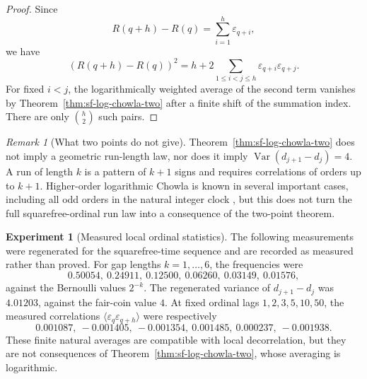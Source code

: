 \documentclass[11pt]{amsart}
\numberwithin{equation}{section}
\theoremstyle{plain}
\theoremstyle{definition}
\newtheorem{experiment}[theorem]{Experiment}
\theoremstyle{remark}
\newtheorem{remark}[theorem]{Remark}
\begin{document}
\begin{proof}
Since
\begin{equation}
\label{eq:fixed-window-increment}
R(q+h)-R(q)=\sum_{i=1}^{h}\varepsilon_{q+i},
\end{equation}
we have
\begin{equation}
\label{eq:fixed-window-square-expand}
(R(q+h)-R(q))^2
=h+2\sum_{1\le i<j\le h}\varepsilon_{q+i}\varepsilon_{q+j}.
\end{equation}
For fixed $i<j$, the logarithmically weighted average of the second term
vanishes by Theorem~\ref{thm:sf-log-chowla-two} after a finite shift of the
summation index.  There are only $\binom h2$ such pairs.
\end{proof}

\begin{remark}[What two points do not give]
\label{rem:two-point-limitations}
Theorem~\ref{thm:sf-log-chowla-two} does not imply a geometric run-length law,
nor does it imply
$\operatorname{Var}(d_{j+1}-d_j)=4$.  A run of length $k$ is a pattern of
$k+1$ signs and requires correlations of orders up to $k+1$.  Higher-order
logarithmic Chowla is known in several important cases, including all odd
orders in the natural integer clock \cite{TaoTeravainen2018}, but this does not
turn the full squarefree-ordinal run law into a consequence of the two-point
theorem.
\end{remark}

\begin{experiment}[Measured local ordinal statistics]
\label{exp:v7-local-statistics}
The following measurements were regenerated for the squarefree-time sequence
and are recorded as measured rather than proved.  For gap lengths
$k=1,\ldots,6$, the frequencies were
\begin{equation}
\label{eq:reported-run-frequencies}
0.50054,\ 0.24911,\ 0.12500,\ 0.06260,\ 0.03149,\ 0.01576,
\end{equation}
against the Bernoulli values $2^{-k}$.  The regenerated variance of
$d_{j+1}-d_j$ was $4.01203$, against the fair-coin value $4$.  At fixed ordinal
lags $1,2,3,5,10,50$, the measured correlations
$\langle\varepsilon_q\varepsilon_{q+h}\rangle$ were respectively
\begin{equation}
\label{eq:reported-fixed-lag-correlations}
0.001087,\ -0.001405,\ -0.001354,\ 0.001485,\ 0.000237,\ -0.001938.
\end{equation}
These finite natural averages are compatible with local decorrelation, but they
are not consequences of Theorem~\ref{thm:sf-log-chowla-two}, whose averaging
is logarithmic.
\end{experiment}
\end{document}
